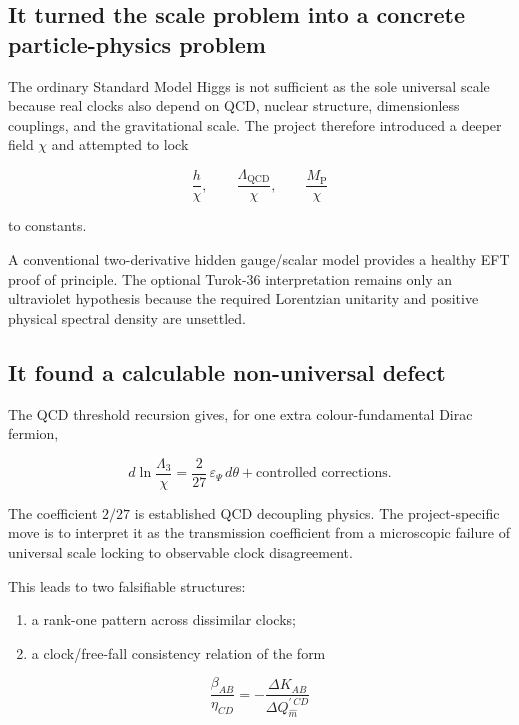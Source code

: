 \documentclass[
  10pt,
]{article}
\providecommand{\tightlist}{%
  \setlength{\itemsep}{0pt}\setlength{\parskip}{0pt}}
\begin{document}
\subsection{It turned the scale problem into a concrete particle-physics
problem}\label{it-turned-the-scale-problem-into-a-concrete-particle-physics-problem}

The ordinary Standard Model Higgs is not sufficient as the sole
universal scale because real clocks also depend on QCD, nuclear
structure, dimensionless couplings, and the gravitational scale. The
project therefore introduced a deeper field \(\chi\) and attempted to
lock

\[
\frac{h}{\chi},
\qquad
\frac{\Lambda_{\mathrm{QCD}}}{\chi},
\qquad
\frac{M_{\mathrm P}}{\chi}
\]

to constants.

A conventional two-derivative hidden gauge/scalar model provides a
healthy EFT proof of principle. The optional Turok-36 interpretation
remains only an ultraviolet hypothesis because the required Lorentzian
unitarity and positive physical spectral density are unsettled.

\subsection{It found a calculable non-universal
defect}\label{it-found-a-calculable-non-universal-defect}

The QCD threshold recursion gives, for one extra colour-fundamental
Dirac fermion,

\[
\boxed{
d\ln\frac{\Lambda_3}{\chi}
=
\frac{2}{27}\,\varepsilon_\Psi\,d\theta
+\text{controlled corrections}.
}
\]

The coefficient \(2/27\) is established QCD decoupling physics. The
project-specific move is to interpret it as the transmission coefficient
from a microscopic failure of universal scale locking to observable
clock disagreement.

This leads to two falsifiable structures:

\begin{enumerate}
\def\labelenumi{\arabic{enumi}.}
\tightlist
\item
  a rank-one pattern across dissimilar clocks;
\item
  a clock/free-fall consistency relation of the form
\end{enumerate}

\[
\boxed{
\frac{\beta_{AB}}{\eta_{CD}}
=
-\frac{\Delta K_{AB}}
{\Delta Q_{\widehat m}^{\prime\,CD}}
}
\]
\end{document}

